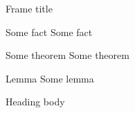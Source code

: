\begin{frame}{Frame title}

\begin{fact}{Some fact}
Some fact
\end{fact}

\begin{theorem}{Some theorem}
    Some theorem
\end{theorem}

\begin{lemma}{Lemma}
    Some lemma
\end{lemma}
\begin{heading}{Heading}
    body
\end{heading}
\end{frame}